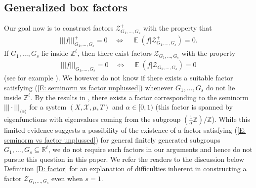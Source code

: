 \documentclass[11pt]{amsart}
\theoremstyle{definition}
\DeclareMathOperator*{\E}{\mathbb{E}}
\newcommand{\R}{{\mathbb R}}
\newcommand{\Z}{{\mathbb Z}}
\newcommand{\CZ}{{\mathcal Z}}
\newcommand{\nnorm}[1]{\lvert\!|\!| #1|\!|\!\rvert}
\newcommand{\1}{{\mathbf{1}}}
\begin{document}
\subsection{Generalized box factors}\label{SS: factors}

Our goal now is to construct factors $\CZ^+_{G_1, \ldots, G_s}$ with the property that
\begin{align}\label{E: seminorm vs factor}
    \nnorm{f}_{G_1, \ldots, G_s}^+ = 0 \quad \Longleftrightarrow \quad \E(f|\CZ_{G_1, \ldots, G_s}^+) = 0.
\end{align}
If $G_1, \ldots, G_s$ lie inside $\Z^\ell$, then %
there exist factors $\CZ_{G_1, \ldots, G_s}$ with the property
\begin{align}\label{E: seminorm vs factor unplussed}
    \nnorm{f}_{G_1, \ldots, G_s} = 0 \quad \Longleftrightarrow \quad \E(f|\CZ_{G_1, \ldots, G_s}) = 0
\end{align}
(see for example \cite{H09, HK05a,S21,TZ16}).
We however do not know if there exists a suitable factor satisfying (\ref{E: seminorm vs factor unplussed}) whenever $G_1, \ldots, G_s$ do not lie inside $\Z^\ell$. By the results in \cite{DKS20}, there exists a factor corresponding to the seminorm $\nnorm{\cdot}_{\langle\alpha\rangle}$ for a system $(X,\mathcal{X},\mu,T)$ and $\alpha\in [0,1)$ (this factor is spanned by eigenfunctions with eigenvalues coming from the subgroup $(\frac{1}{\alpha}\Z)/\Z$). While this limited evidence suggests a possibility of the existence of a factor satisfying (\ref{E: seminorm vs factor unplussed}) for general finitely generated subgroups $G_1, \ldots, G_s\subseteq\R^\ell$, we do not require such factors in our arguments and hence do not pursue this question in this paper. We refer the readers to the discussion below Definition \ref{D: factor} for an explanation of difficulties inherent in constructing a factor $\CZ_{G_1, \ldots, G_s}$ even when $s=1$.

\end{document}
